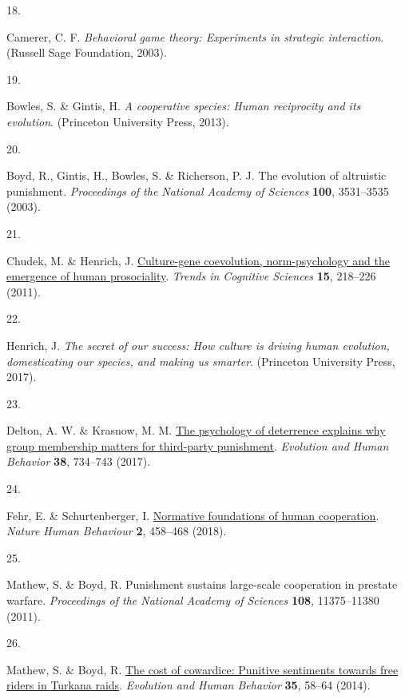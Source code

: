 \documentclass[
  man,floatsintext]{apa6}
\newlength{\cslhangindent}
\newlength{\csllabelwidth}
\newlength{\cslentryspacingunit} %
\newenvironment{CSLReferences}[2] %
 {%
  \setlength{\parindent}{0pt}
  \ifodd #1
  \let\oldpar\par
  \def\par{\hangindent=\cslhangindent\oldpar}
  \fi
  \setlength{\parskip}{#2\cslentryspacingunit}
 }%
 {}
\newcommand{\CSLLeftMargin}[1]{\parbox[t]{\csllabelwidth}{#1}}
\newcommand{\CSLRightInline}[1]{\parbox[t]{\linewidth - \csllabelwidth}{#1}\break}
\begin{document}
\begin{CSLReferences}{0}{0}
\leavevmode{}%
\CSLLeftMargin{18. }%
\CSLRightInline{Camerer, C. F. \emph{Behavioral game theory: Experiments in strategic interaction}. (Russell Sage Foundation, 2003).}

\leavevmode{}%
\CSLLeftMargin{19. }%
\CSLRightInline{Bowles, S. \& Gintis, H. \emph{A cooperative species: Human reciprocity and its evolution}. (Princeton University Press, 2013).}

\leavevmode{}%
\CSLLeftMargin{20. }%
\CSLRightInline{Boyd, R., Gintis, H., Bowles, S. \& Richerson, P. J. The evolution of altruistic punishment. \emph{Proceedings of the National Academy of Sciences} \textbf{100}, 3531--3535 (2003).}

\leavevmode{}%
\CSLLeftMargin{21. }%
\CSLRightInline{Chudek, M. \& Henrich, J. \href{https://doi.org/10.1016/j.tics.2011.03.003}{Culture-gene coevolution, norm-psychology and the emergence of human prosociality}. \emph{Trends in Cognitive Sciences} \textbf{15}, 218--226 (2011).}

\leavevmode{}%
\CSLLeftMargin{22. }%
\CSLRightInline{Henrich, J. \emph{The secret of our success: How culture is driving human evolution, domesticating our species, and making us smarter}. (Princeton University Press, 2017).}

\leavevmode{}%
\CSLLeftMargin{23. }%
\CSLRightInline{Delton, A. W. \& Krasnow, M. M. \href{https://doi.org/10.1016/j.evolhumbehav.2017.07.003}{The psychology of deterrence explains why group membership matters for third-party punishment}. \emph{Evolution and Human Behavior} \textbf{38}, 734--743 (2017).}

\leavevmode{}%
\CSLLeftMargin{24. }%
\CSLRightInline{Fehr, E. \& Schurtenberger, I. \href{https://doi.org/10.1038/s41562-018-0385-5}{Normative foundations of human cooperation}. \emph{Nature Human Behaviour} \textbf{2}, 458--468 (2018).}

\leavevmode{}%
\CSLLeftMargin{25. }%
\CSLRightInline{Mathew, S. \& Boyd, R. Punishment sustains large-scale cooperation in prestate warfare. \emph{Proceedings of the National Academy of Sciences} \textbf{108}, 11375--11380 (2011).}

\leavevmode{}%
\CSLLeftMargin{26. }%
\CSLRightInline{Mathew, S. \& Boyd, R. \href{https://doi.org/10.1016/j.evolhumbehav.2013.10.001}{The cost of cowardice: Punitive sentiments towards free riders in {Turkana} raids}. \emph{Evolution and Human Behavior} \textbf{35}, 58--64 (2014).}


\end{CSLReferences}
\end{document}
